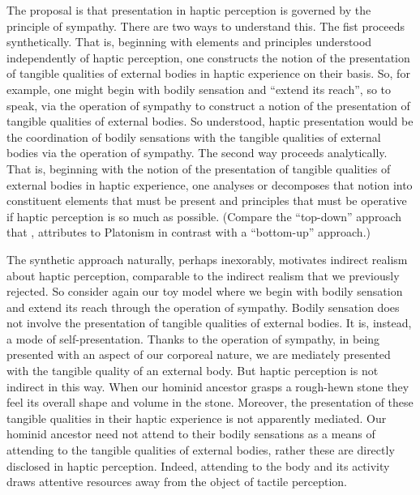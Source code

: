 The proposal is that presentation in haptic perception is governed by the principle of sympathy. There are two ways to understand this. The fist proceeds synthetically. That is, beginning with elements and principles understood independently of haptic perception, one constructs the notion of the presentation of tangible qualities of external bodies in haptic experience on their basis. So, for example, one might begin with bodily sensation and ``extend its reach'', so to speak, via the operation of sympathy to construct a notion of the presentation of tangible qualities of external bodies. So understood, haptic presentation would be the coordination of bodily sensations with the tangible qualities of external bodies via the operation of sympathy. The second way proceeds analytically. That is, beginning with the notion of the presentation of tangible qualities of external bodies in haptic experience, one analyses or decomposes that notion into constituent elements that must be present and principles that must be operative if haptic perception is so much as possible. (Compare the ``top-down'' approach that \citealt[chapter 1]{Gerson:2005aa}, attributes to Platonism in contrast with a ``bottom-up'' approach.)

The synthetic approach naturally, perhaps inexorably, motivates indirect realism about haptic perception, comparable to the indirect realism that we previously rejected. So consider again our toy model where we begin with bodily sensation and extend its reach through the operation of sympathy. Bodily sensation does not involve the presentation of tangible qualities of external bodies. It is, instead, a mode of self-presentation. Thanks to the operation of sympathy, in being presented with an aspect of our corporeal nature, we are mediately presented with the tangible quality of an external body. But haptic perception is not indirect in this way. When our hominid ancestor grasps a rough-hewn stone they feel its overall shape and volume in the stone. Moreover, the presentation of these tangible qualities in their haptic experience is not apparently mediated. Our hominid ancestor need not attend to their bodily sensations as a means of attending to the tangible qualities of external bodies, rather these are directly disclosed in haptic perception. Indeed, attending to the body and its activity draws attentive resources away from the object of tactile perception. 



